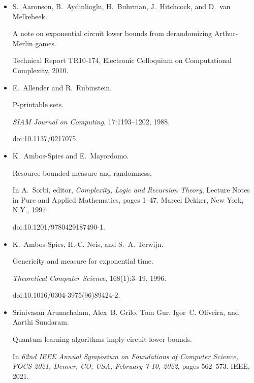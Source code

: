 \documentclass[10pt,a4paper]{article}
\begin{document}
\begin{itemize}


\item[] 
[1]

S. Aaronson, B. Aydinlioglu, H. Buhrman, J. Hitchcock, and D. van Melkebeek.


A note on exponential circuit lower bounds from derandomizing
Arthur-Merlin games.


Technical Report TR10-174, Electronic Colloquium on Computational
Complexity, 2010.





\item[] 
[2]

E. Allender and R. Rubinstein.


P-printable sets.


\emph{SIAM Journal on Computing}, 17:1193–1202, 1988.


doi:10.1137/0217075.





\item[] 
[3]

K. Ambos-Spies and E. Mayordomo.


Resource-bounded measure and randomness.


In A. Sorbi, editor, \emph{Complexity, Logic and Recursion Theory},
Lecture Notes in Pure and Applied Mathematics, pages 1–47. Marcel Dekker,
New York, N.Y., 1997.


doi:10.1201/9780429187490-1.





\item[] 
[4]

K. Ambos-Spies, H.-C. Neis, and S. A. Terwijn.


Genericity and measure for exponential time.


\emph{Theoretical Computer Science}, 168(1):3–19, 1996.


doi:10.1016/0304-3975(96)89424-2.





\item[] 
[5]

Srinivasan Arunachalam, Alex B. Grilo, Tom Gur, Igor C. Oliveira, and Aarthi
Sundaram.


Quantum learning algorithms imply circuit lower bounds.


In \emph{62nd IEEE Annual Symposium on Foundations of Computer
Science, FOCS 2021, Denver, CO, USA, February 7-10, 2022}, pages 562–573.
IEEE, 2021.



\end{itemize}
\end{document}
